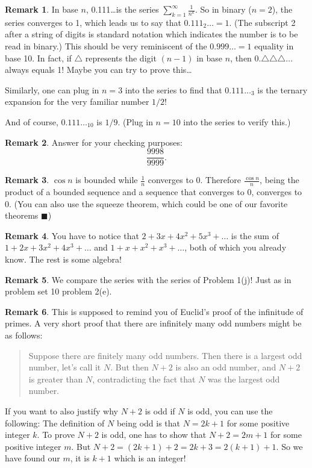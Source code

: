 \documentclass[11pt,oneside]{amsart}
\theoremstyle{definition}
\newtheorem{remark}{Remark}
\begin{document}
\begin{remark}
  In base $n$, 0.111\ldots is the series $\sum_{k=1}^\infty \frac 1{n^k}$. So in binary ($n=2$), the series converges to 1, which leads us to say that $0.111_2\ldots=1$. (The subscript 2 after a string of digits is standard notation which indicates the number is to be read in binary.) This should be very reminiscent of the $0.999\ldots=1$ equality in base 10. In fact, if $\triangle$ represents the digit $(n-1)$ in base $n$, then $0.\triangle\triangle\triangle\ldots$ always equals 1! Maybe you can try to prove this\ldots

  Similarly, one can plug in $n=3$ into the series to find that $0.111\ldots_3$ is the ternary expansion for the very familiar number $1/2$!

  And of course, $0.111\ldots_{10}$ is $1/9$. (Plug in $n=10$ into the series to verify this.)
\end{remark}

\begin{remark}
  Answer for your checking purposes:
  \[\frac{9998}{9999}.\]
\end{remark}

\begin{remark}
  $\cos n$ is bounded while $\frac 1n$ converges to 0. Therefore $\frac{\cos n}n$, being the product of a bounded sequence and a sequence that converges to 0, converges to 0. (You can also use the squeeze theorem, which could be one of our favorite theorems $\blacksquare$)
\end{remark}

\begin{remark}
  You have to notice that $2+3x+4x^2+5x^3+\dots$ is the sum of $1+2x+3x^2+4x^3+\dots$ and $1+x+x^2+x^3+\dots$, both of which you already know. The rest is some algebra!
\end{remark}

\begin{remark}
  We compare the series with the series of Problem 1(j)! Just as in problem set 10 problem 2(e).
\end{remark}

\begin{remark}
  This is supposed to remind you of Euclid's proof of the infinitude of primes. A very short proof that there are infinitely many odd numbers might be as follows:
  \begin{quote}
    Suppose there are finitely many odd numbers. Then there is a largest odd number, let's call it $N$. But then $N+2$ is also an odd number, and $N+2$ is greater than $N$, contradicting the fact that $N$ was the largest odd number.
  \end{quote}
  If you want to also justify why $N+2$ is odd if $N$ is odd, you can use the following: The definition of $N$ being odd is that $N=2k+1$ for some positive integer $k$. To prove $N+2$ is odd, one has to show that $N+2=2m+1$ for some positive integer $m$. But $N+2=(2k+1)+2=2k+3=2(k+1)+1$. So we have found our $m$, it is $k+1$ which is an integer!
\end{remark}
\end{document}
